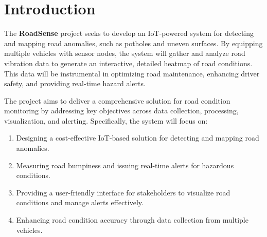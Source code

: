 \section{Introduction}

The \textbf{RoadSense} project seeks to develop an IoT-powered system for detecting and mapping road anomalies, such as potholes and uneven surfaces. By equipping multiple vehicles with sensor nodes, the system will gather and analyze road vibration data to generate an interactive, detailed heatmap of road conditions. This data will be instrumental in optimizing road maintenance, enhancing driver safety, and providing real-time hazard alerts.

The project aims to deliver a comprehensive solution for road condition monitoring by addressing key objectives across data collection, processing, visualization, and alerting. Specifically, the system will focus on:

\begin{enumerate}[label=\arabic*.]
	\item Designing a cost-effective IoT-based solution for detecting and mapping road anomalies.
	\item Measuring road bumpiness and issuing real-time alerts for hazardous conditions.
	\item Providing a user-friendly interface for stakeholders to visualize road conditions and manage alerts effectively.
	\item Enhancing road condition accuracy through data collection from multiple vehicles.
\end{enumerate}
